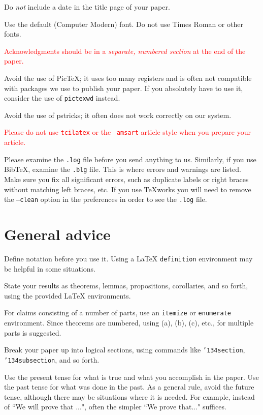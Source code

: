 \documentclass[12pt]{article}
\begin{document}
    Do {\it not\/} include a date in the title page of your paper.

    Use the default (Computer Modern) font.  Do not use Times Roman or
other fonts.

    \textcolor{red}{Acknowledgments should be in a {\it separate, numbered
section} at the end of the paper.}

Avoid the use of PicTeX; it uses too many registers and is often not
compatible with packages we use to publish your paper.  If you
absolutely have to use it, consider the use of {\tt pictexwd} instead.

Avoid the use of pstricks; it often does not work correctly on our system.

     \textcolor{red}{Please do not use {\tt tcilatex} or the {\tt
amsart} article style when you prepare your article.}

Please examine the {\tt .log} file before you send anything to us.
Similarly, if you use BibTeX, examine the {\tt .blg} file.
This is where errors and warnings are listed.   Make sure you 
fix all significant errors, such as duplicate labels or right braces
without matching left braces, etc.   If you use TeXworks
you will need to remove the {\tt --clean} option in the preferences
in order to see the {\tt .log} file.

\section{General advice}

Define notation before you use it.  Using a LaTeX {\tt definition} 
environment may be helpful in some situations.

State your results as theorems, lemmas, propositions, corollaries, and so forth, using the provided LaTeX environments.

For claims consisting of a number of parts, use an {\tt itemize} or
{\tt enumerate} environment.   Since theorems are numbered, using
(a), (b), (c), etc., for multiple parts is suggested.

Break your paper up into logical sections, using commands like
{\tt \char'134section}, {\tt \char'134subsection}, and so forth.

Use the present tense for what is true and what you accomplish in the paper.
Use the past tense for what was done in the past.   As a general rule,
avoid the future tense, although there may be situations where it is
needed.  For example, instead of ``We will prove that ...", often the
simpler ``We prove that..."  suffices.
\end{document}
